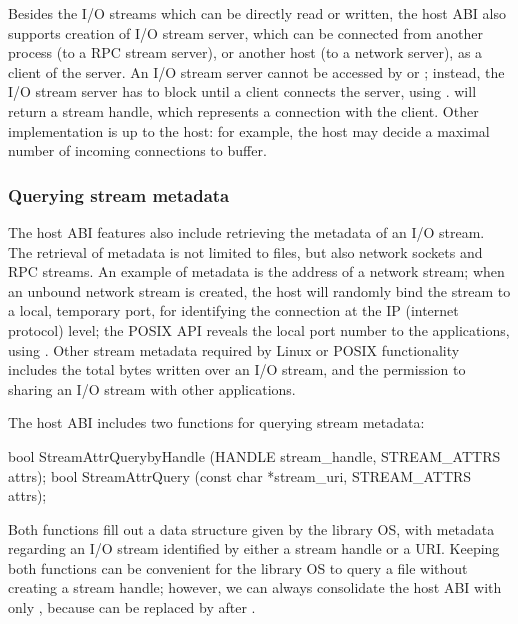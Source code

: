 Besides the I/O streams which can be directly read or written,
the host ABI also supports creation
of I/O stream server, which can be
connected from another process (to a RPC stream server), or another host (to a network server), as a client of the server.
An I/O stream server cannot be accessed by  or ;
instead, the I/O stream server has to block until a client
connects the server, using .
 will return a stream handle, which represents a connection with the client.
Other implementation
is up to the host: for example,
the host may decide a maximal number of incoming connections to buffer.









\subsubsection*{Querying stream metadata}

The host ABI features also include retrieving the metadata of an I/O stream.
The retrieval of metadata is not limited to files,
but also network sockets and RPC streams. %
An example of metadata is the address of a network stream;
when an unbound network stream is created,
the host will randomly bind the stream to a local, temporary port, for identifying the connection at the IP (internet protocol) level;
the POSIX API
reveals the local port number
to the applications,
using .
Other stream metadata required by Linux or POSIX functionality
includes the total bytes written over an I/O stream, and the permission to sharing an I/O stream with other applications.



The host ABI includes two functions for querying stream metadata:

\begin{paldef}
bool StreamAttrQuerybyHandle (HANDLE stream_handle,
                              STREAM_ATTRS attrs);
bool StreamAttrQuery (const char *stream_uri,
                      STREAM_ATTRS attrs);

\end{paldef}

Both functions fill out a data structure given by the library OS,
with metadata regarding an I/O stream
identified by either a stream handle or a URI.
Keeping both functions can be convenient for the library OS to query a file without creating a stream handle;
however, we can always consolidate the host ABI
with only ,
because  can be replaced by 
after .


